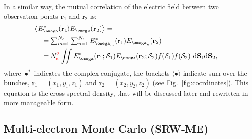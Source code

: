 \documentclass{iucr}              %
\newcommand{\inred}[1]{{\color{red}#1}}
\begin{document}
In a similar way, the mutual correlation of the electric field between two observation points $\textbf{r}_1$ and $\textbf{r}_2$ is:
\begin{equation}\label{eq:CSDallaChubar}
\begin{split}
      &\big\langle E^*_{\omega}(\textbf{r}_1) E_{\omega}(\textbf{r}_2)\big\rangle = \\
      &\quad = \sum_{m=1}^{N_e} \sum_{n=1}^{N_e} E^*_{\omega_{m}}(\textbf{r}_1) E_{\omega_{n}}(\textbf{r}_2)\\
      &\quad = N_e^\inred{2}\iint
      E^*_{\omega}(\textbf{r}_1;\mathcal{S}_1)
      E_{\omega}(\textbf{r}_2;\mathcal{S}_2)
      f(\mathcal{S}_1) f(\mathcal{S}_2)~
      \text{d}\textbf{S}_1 \text{d}\textbf{S}_2,
\end{split}
\end{equation}
where $\bullet^*$ indicates the complex conjugate, the brackets $\langle \bullet \rangle$ indicate sum over the bunches, $\textbf{r}_1=(x_1,y_1,z_1)$ and $\textbf{r}_2=(x_2,y_2,z_2)$ (see Fig.~\ref{fig:coordinates}). This equation is the cross-spectral density, that will be discussed later and rewritten in more manageable form.

\subsection{Multi-electron Monte Carlo (SRW-ME)}
\end{document}
